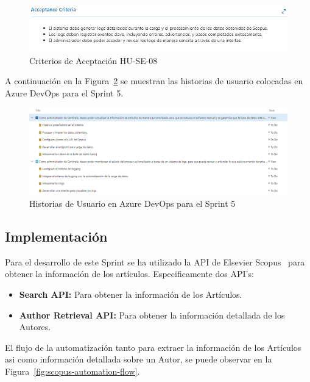 \begin{figure}[H]
    \centering
    \includegraphics[scale=0.8]{../02Figures/02Chapter/Sprints/Sprint-5/aceptance-criteria-HU-SE-08.png}
    \caption{Criterios de Aceptación HU-SE-08}\label{C2F2:Criterios de Aceptacion HU-SE-08}
\end{figure}

A continuación en la Figura~\ref{fig:azure-board-sprint-5} se muestran las historias de usuario colocadas en Azure DevOps para el Sprint 5.
\begin{figure}[H]
    \centering
    \includegraphics[scale=0.5]{../02Figures/02Chapter/Sprints/Sprint-5/azure-dev-ops-hu-5.png}
    \caption{Historias de Usuario en Azure DevOps para el Sprint 5}\label{fig:azure-board-sprint-5}
\end{figure}

\subsection{Implementación}
Para el desarrollo de este Sprint se ha utilizado la API de Elsevier Scopus~\cite{ElSEVIER} 
para obtener la información de los artículos.
Especificamente dos API's:
\begin{itemize}
    \item \textbf{Search API:} Para obtener la información de los Artículos.
    \item \textbf{Author Retrieval API:} Para obtener la información detallada de los Autores.
\end{itemize}

El flujo de la automatización tanto para extraer la información de los Artículos asi como información detallada sobre un Autor, se puede observar en la Figura~\ref{fig:scopus-automation-flow}.

